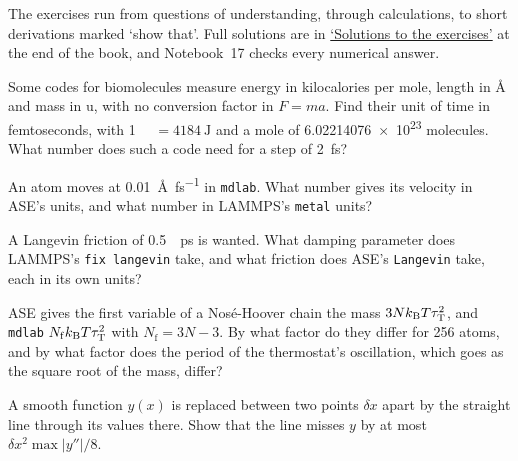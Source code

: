 \label{sec:ip-exercises}

The exercises run from questions of understanding, through calculations,
to short derivations marked `show that'. Full solutions are in
\hyperref[sec:ip-solutions]{`Solutions to the exercises'} at the end of
the book, and Notebook~17 checks every numerical answer.

\begin{exercise}
\label{ex:ip-time-unit}
Some codes for biomolecules measure energy in kilocalories per mole,
length in \si{\angstrom} and mass in \si{\amu}, with no conversion factor
in $F = ma$. Find their unit of time in femtoseconds, with
\SI{1}{\kilo\calorie} $= \SI{4184}{\joule}$ and a mole of
\num{6.02214076e23} molecules. What number does such a code need for a
step of \SI{2}{\femto\second}?
\end{exercise}

\begin{exercise}
\label{ex:ip-velocity}
An atom moves at \SI{0.01}{\angstrom\per\femto\second} in \texttt{mdlab}.
What number gives its velocity in ASE's units, and what number in LAMMPS's
\texttt{metal} units?
\end{exercise}

\begin{exercise}
\label{ex:ip-friction}
A Langevin friction of \SI{0.5}{\per\pico\second} is wanted. What damping
parameter does LAMMPS's \texttt{fix langevin} take, and what friction does
ASE's \texttt{Langevin} take, each in its own units?
\end{exercise}

\begin{exercise}
\label{ex:ip-chain-mass}
ASE gives the first variable of a Nosé-Hoover chain the mass $3Nk_{\mathrm{B}}
T\tau_{\mathrm T}^2$, and \texttt{mdlab} $N_{\mathrm f}k_{\mathrm{B}} T\tau_{\mathrm
T}^2$ with $N_{\mathrm f} = 3N - 3$. By what factor do they differ for 256 atoms, and by what
factor does the period of the thermostat's oscillation, which goes as the
square root of the mass, differ?
\end{exercise}

\begin{exercise}
\label{ex:ip-table}
A smooth function $y(x)$ is replaced between two points $\delta x$ apart
by the straight line through its values there. Show that the line misses
$y$ by at most $\delta x^2\max\lvert y''\rvert/8$.
\end{exercise}

